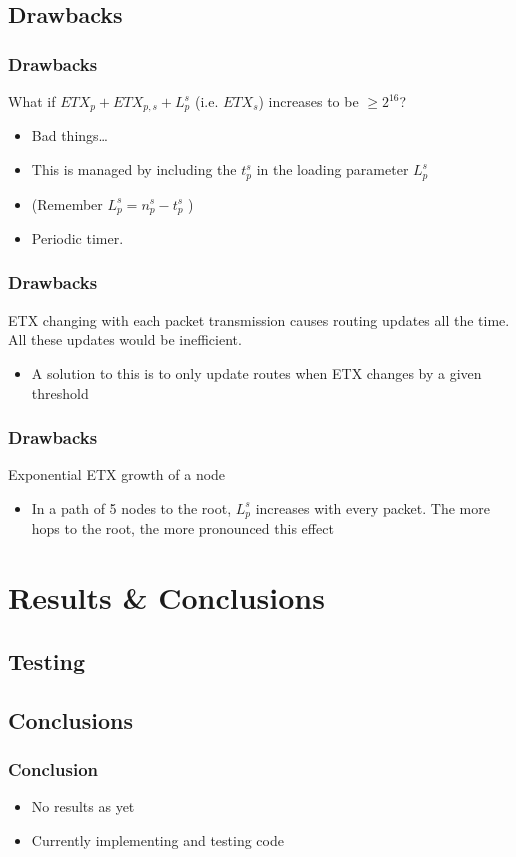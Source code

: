 \documentclass{beamer}
\begin{document}
\subsection{Drawbacks}

\begin{frame}[fragile]
  \frametitle{Drawbacks}
    What if $ETX_p + ETX_{p,s} + L_p^s$ (i.e. $ETX_s$) increases to be $\geq 2^{16}$?
  \begin{itemize}
    \item Bad things\ldots
    \item This is managed by including the $t_p^s$ in the loading parameter
    $L_p^s$
    \item (Remember $L_p^s = n_p^s - t_p^s$ )
    \item Periodic timer.
  \end{itemize}

\end{frame}  



\begin{frame}
  \frametitle{Drawbacks}
    ETX changing with each packet transmission causes routing updates all the
    time. All these updates would be inefficient.
  \begin{itemize}
    \item A solution to this is to only update routes when ETX changes by a given
    threshold
    \end{itemize}
\end{frame}  


\begin{frame}
  \frametitle{Drawbacks}
    Exponential ETX growth of a node
  \begin{itemize}
    \item In a path of 5 nodes to the root, $L_p^s$ increases with every packet.
    The more hops to the root, the more pronounced this effect
  \end{itemize}
\end{frame}  


\section{Results \& Conclusions}
\subsection{Testing}

\subsection{Conclusions}

\begin{frame}
  \frametitle{Conclusion}
  \begin{itemize}
    \item No results as yet
    \item Currently implementing and testing code
  \end{itemize}
\end{frame}  
\end{document}
